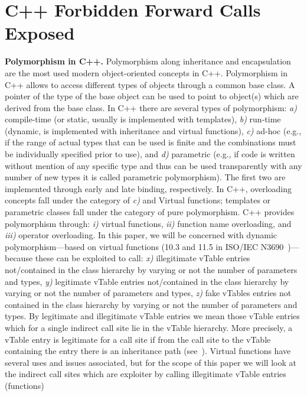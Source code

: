 \section{C++ Forbidden Forward Calls Exposed}
\label{C++ Bad Forward Indirect Calls}
\textbf{Polymorphism in C++.}
\label{Polymorphism in C++}
Polymorphism along inheritance and encapsulation
are the most used modern object-oriented concepts
in C++. 
Polymorphism in C++ allows to access different types of objects 
through a common base class. A pointer of the type of the base object
can be used to point to object(s) which are derived from the base class.
In C++ there are several types of polymorphism:
\textit{a)} compile-time (or static, usually is implemented with templates), 
\textit{b)} run-time (dynamic, is implemented with inheritance and virtual functions), 
\textit{c)} ad-hoc (e.g., if the range of actual types that can be used 
is finite and the combinations must be individually specified prior to use), and
\textit{d)} parametric (e.g., if code is written without mention of any 
specific type and thus can be used transparently with any number of new types it
is called parametric polymorphism). 
The first two are implemented through early 
and late binding, respectively.
In C++, overloading concepts fall under the category of \textit{c)} and Virtual functions;
templates or parametric classes fall under the category of pure polymorphism.
C++ provides polymorphism through: 
\textit{i)} virtual functions,
\textit{ii)} function name overloading, and 
\textit{iii)} operator overloading. 
In this paper, we will be concerned with dynamic 
polymorphism---based on virtual functions (10.3 and 11.5 in 
ISO/IEC N3690~\cite{iso:iecN3690})---because these can be exploited to 
call: 
\textit{x)} illegitimate vTable entries not/contained in the 
class hierarchy by varying or not the number of parameters and types,
\textit{y)} legitimate vTable entries not/contained in the
class hierarchy by varying or not the number of parameters and types,
\textit{z)} fake vTables entries not contained in the class hierarchy 
by varying or not the number of parameters and types.
By legitimate and illegitimate vTable entries we mean those 
vTable entries which for a single indirect call site lie in the 
vTable hierarchy. More precisely, a vTable entry is legitimate for 
a call site if from the call site to the vTable containing the entry there
is an inheritance path (see~\cite{haller:shrinkwrap}).
Virtual functions have several uses and issues associated, 
but for the scope of this paper we will look at the indirect 
call sites which are exploiter by calling illegitimate vTable entries (functions)
